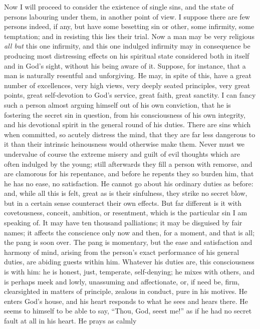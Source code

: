 Now I will proceed to consider the existence of single sins, and
the state of persons labouring under them, in another point of view. I
suppose there are few persons indeed, if any, but have some besetting
sin or other, some infirmity, some temptation; and in resisting this
lies their trial. Now a man may be very religious \emph{all but} this
one infirmity, and this one indulged infirmity may in consequence be
producing most distressing effects on his spiritual state considered
both in itself and in God's sight, without his being aware of it.
Suppose, for instance, that a man is naturally resentful and
unforgiving. He may, in spite of this, have a great number of
excellences, very high views, very deeply seated principles, very
great points, great self-devotion to God's service, great faith, great
sanctity. I can fancy such a person almost arguing himself out of his
own conviction, that he is fostering the secret sin in question, from
his consciousness of his own integrity, and his devotional spirit in
the general round of his duties. There are sins which when committed,
so acutely distress the mind, that they are far less dangerous to it
than their intrinsic heinousness would otherwise make them. Never must
we undervalue of course the extreme misery and guilt of evil thoughts
which are often indulged by the young; still afterwards they fill a
person with remorse, and are clamorous for his repentance, and before
he repents they so burden him, that he has no ease, no satisfaction.
He cannot go about his ordinary duties as before: and, while all this
is felt, great as is their sinfulness, they strike no secret blow, but
in a certain sense counteract their own effects. But far different is
it with covetousness, conceit, ambition, or resentment, which is the
particular sin I am speaking of. It may have ten thousand palliations;
it may be disguised by fair names; it affects the conscience only now
and then, for a moment, and that is all; the pang is soon over. The
pang is momentary, but the ease and satisfaction and harmony of mind,
arising from the person's exact performance of his general duties, are
abiding guests within him. Whatever his duties are, this consciousness
is with him: he is honest, just, temperate, self-denying; he mixes
with others, and is perhaps meek and lowly, unassuming and
affectionate, or, if need be, firm, clearsighted in matters of
principle, zealous in conduct, pure in his motives. He enters God's
house, and his heart responds to what he sees and hears there. He
seems to himself to be able to say, ``Thou, God, seest me!''
as if he had no secret fault at all in his heart. He prays as calmly
